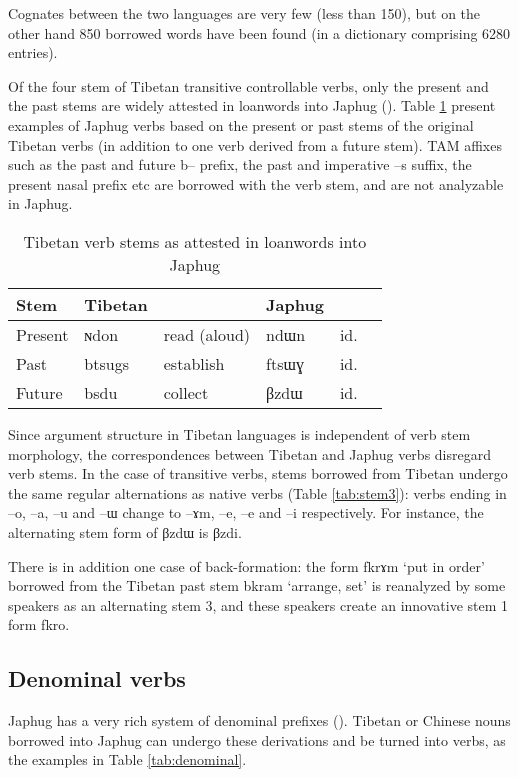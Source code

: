 \documentclass[oldfontcommands,oneside,a4paper,11pt]{article}
\newcommand{\ipa}[1]{{\phon \mbox{#1}}} %
\begin{document}
Cognates between the two languages are very few (less than 150), but on the other hand 850 borrowed words have been found (in a dictionary comprising 6280 entries).


Of the four stem of Tibetan transitive controllable verbs, only the present and the past stems are widely attested in loanwords into Japhug (\citealt[138]{jacques04these}). Table  \ref{tab:four.stems} present examples of Japhug verbs based on the present or past stems of the original Tibetan verbs (in addition to one verb derived from a future stem). TAM affixes such as the past and future \ipa{b--} prefix, the past and imperative \ipa{--s} suffix, the present nasal prefix etc are borrowed with the verb stem, and are not analyzable in Japhug.

 \begin{table} 
\caption{Tibetan verb stems as attested in loanwords into Japhug} \label{tab:four.stems} \centering
\begin{tabular}{llllll}
\toprule
Stem&Tibetan && Japhug &\\
\midrule
Present & \ipa{ɴdon} & read (aloud) & \ipa{ndɯn} &id.&\\
Past  & \ipa{btsugs} & establish & \ipa{ftsɯɣ} &id.&\\
Future & \ipa{bsdu} & collect & \ipa{βzdɯ} & id.\\
\bottomrule
\end{tabular}
\end{table}

Since argument structure in Tibetan languages is independent of verb stem morphology, the correspondences between Tibetan and Japhug verbs disregard verb stems. In the case of transitive verbs, stems borrowed from Tibetan undergo the same regular alternations  as native verbs (Table \ref{tab:stem3}): verbs ending in \ipa{--o}, \ipa{--a}, \ipa{--u} and \ipa{--ɯ} change to \ipa{--ɤm}, \ipa{--e}, \ipa{--e} and \ipa{--i} respectively. For instance, the alternating stem form of \ipa{βzdɯ} is \ipa{βzdi}.

There is in addition one case of back-formation: the form \ipa{fkrɤm} `put in order' borrowed from the Tibetan past stem \ipa{bkram} `arrange, set' is reanalyzed by some speakers as an alternating stem 3, and these speakers create an innovative stem 1 form \ipa{fkro}.

 
\subsection{Denominal verbs}\label{sec:denominal}
Japhug has a very rich system of denominal prefixes (\citealt{jacques12incorp, jacques14antipassive}). Tibetan or Chinese nouns borrowed into Japhug can undergo these derivations and be turned into verbs, as the examples in Table \ref{tab:denominal}.
\end{document}
